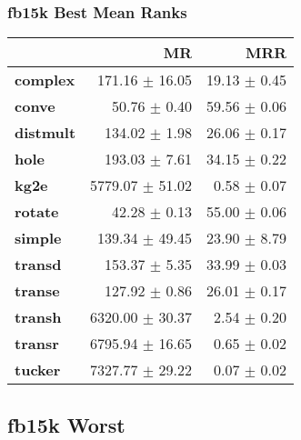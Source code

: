 \documentclass{article}
\begin{document}
\subsubsection{fb15k Best Mean Ranks}
    \begin{center}
    \begin{tabular}{lrr}
\toprule
{} &               MR &           MRR \\
\midrule
\textbf{complex } &   171.16 $\pm$ 16.05 &  19.13 $\pm$ 0.45 \\
\textbf{conve   } &     50.76 $\pm$ 0.40 &  59.56 $\pm$ 0.06 \\
\textbf{distmult} &    134.02 $\pm$ 1.98 &  26.06 $\pm$ 0.17 \\
\textbf{hole    } &    193.03 $\pm$ 7.61 &  34.15 $\pm$ 0.22 \\
\textbf{kg2e    } &  5779.07 $\pm$ 51.02 &   0.58 $\pm$ 0.07 \\
\textbf{rotate  } &     42.28 $\pm$ 0.13 &  55.00 $\pm$ 0.06 \\
\textbf{simple  } &   139.34 $\pm$ 49.45 &  23.90 $\pm$ 8.79 \\
\textbf{transd  } &    153.37 $\pm$ 5.35 &  33.99 $\pm$ 0.03 \\
\textbf{transe  } &    127.92 $\pm$ 0.86 &  26.01 $\pm$ 0.17 \\
\textbf{transh  } &  6320.00 $\pm$ 30.37 &   2.54 $\pm$ 0.20 \\
\textbf{transr  } &  6795.94 $\pm$ 16.65 &   0.65 $\pm$ 0.02 \\
\textbf{tucker  } &  7327.77 $\pm$ 29.22 &   0.07 $\pm$ 0.02 \\
\bottomrule
\end{tabular}

    \end{center}
\subsection{fb15k Worst}
\end{document}
